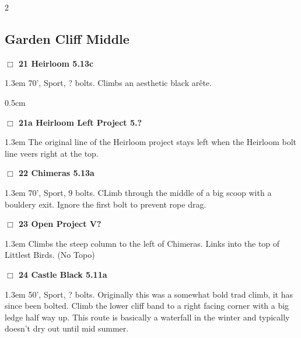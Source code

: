 \begin{multicols}{2}
\subsection*{Garden Cliff Middle}\label{bf:Garden Cliff Middle}
\needspace{2em}
\label{rt:Heirloom}
\colorbox{Goldenrod!20}{
\parbox{0.95\linewidth}{
\hspace{-1ex}\textbf{$\Box$
21 Heirloom 5.13c  
}}}
\begin{adjustwidth}{1.3em}{}			
70', Sport, ? bolts. Climbs an aesthetic black arête.
\end{adjustwidth}
\begin{adjustwidth}{0.5cm}{}				
\needspace{4em}
\needspace{2em}
\label{vr:Heirloom Left Project}
\colorbox{black!20}{
\parbox{0.95\linewidth}{
\hspace{-1ex}\textbf{$\Box$
21a Heirloom Left Project 5.?  
}}}
\begin{adjustwidth}{1.3em}{}			
The original line of the Heirloom project stays left when the Heirloom bolt line veers right at the top.
\end{adjustwidth}
\end{adjustwidth}
\needspace{2em}
\label{rt:Chimeras}
\colorbox{Goldenrod!20}{
\parbox{0.95\linewidth}{
\hspace{-1ex}\textbf{$\Box$
22 Chimeras 5.13a  
}}}
\begin{adjustwidth}{1.3em}{}			
70', Sport, 9 bolts. CLimb through the middle of a big scoop with a bouldery exit. Ignore the first bolt to prevent rope drag.
\end{adjustwidth}
\needspace{2em}
\label{rt:cliffs_proj_2}
\colorbox{black!20}{
\parbox{0.95\linewidth}{
\hspace{-1ex}\textbf{$\Box$
23 Open Project V?  
}}}
\begin{adjustwidth}{1.3em}{}			
Climbs the steep column to the left of Chimeras. Links into the top of Littlest Birds.
  (No Topo)
\end{adjustwidth}
\needspace{2em}
\label{rt:Castle Black}
\colorbox{RoyalBlue!20}{
\parbox{0.95\linewidth}{
\hspace{-1ex}\textbf{$\Box$
24 Castle Black 5.11a  
}}}
\begin{adjustwidth}{1.3em}{}			
50', Sport, ? bolts. Originally this was a somewhat bold trad climb, it has since been bolted. Climb the lower cliff band to a right facing corner with a big ledge half way up. This route is basically a waterfall in the winter and typically doesn't dry out until mid summer.

\end{adjustwidth}
\end{multicols}
